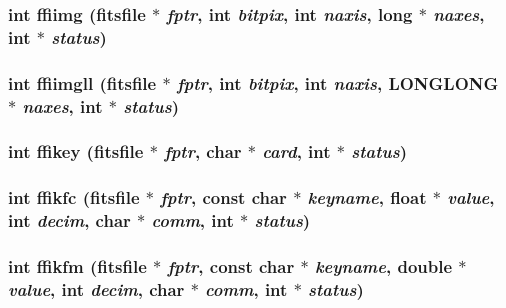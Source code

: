\subsubsection{\setlength{\rightskip}{0pt plus 5cm}int ffiimg (\bf{fitsfile} $\ast$ {\em fptr}, int {\em bitpix}, int {\em naxis}, long $\ast$ {\em naxes}, int $\ast$ {\em status})}\label{fitsio__64_8h_bdfe7ce055dc6e2df14de16381703b35}


\subsubsection{\setlength{\rightskip}{0pt plus 5cm}int ffiimgll (\bf{fitsfile} $\ast$ {\em fptr}, int {\em bitpix}, int {\em naxis}, \bf{LONGLONG} $\ast$ {\em naxes}, int $\ast$ {\em status})}\label{fitsio__64_8h_657626db84e4c427330c2684375832d5}


\subsubsection{\setlength{\rightskip}{0pt plus 5cm}int ffikey (\bf{fitsfile} $\ast$ {\em fptr}, char $\ast$ {\em card}, int $\ast$ {\em status})}\label{fitsio__64_8h_3fad2ca6c44422526a0994f06d424607}


\subsubsection{\setlength{\rightskip}{0pt plus 5cm}int ffikfc (\bf{fitsfile} $\ast$ {\em fptr}, const char $\ast$ {\em keyname}, float $\ast$ {\em value}, int {\em decim}, char $\ast$ {\em comm}, int $\ast$ {\em status})}\label{fitsio__64_8h_39166dca79658791f345fcd1af07329d}


\subsubsection{\setlength{\rightskip}{0pt plus 5cm}int ffikfm (\bf{fitsfile} $\ast$ {\em fptr}, const char $\ast$ {\em keyname}, double $\ast$ {\em value}, int {\em decim}, char $\ast$ {\em comm}, int $\ast$ {\em status})}\label{fitsio__64_8h_a7af1984471fc7e31de5f5a5111407e4}


